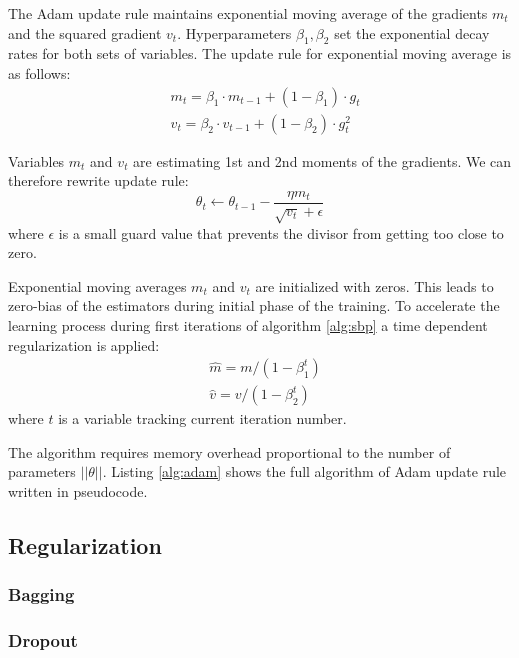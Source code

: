The Adam update rule maintains exponential moving average of the gradients $m_t$ and the squared gradient $v_t$.
Hyperparameters $\beta_1, \beta_2$ set the exponential decay rates for both sets of variables.
The update rule for exponential moving average is as follows:
\begin{equation*}
  \begin{aligned}
    & m_t = \beta_1 \cdot m_{t-1} + (1-\beta_1) \cdot g_t \\
    & v_t = \beta_2 \cdot v_{t-1} + (1-\beta_2) \cdot g_t^2
  \end{aligned}
\end{equation*}

Variables $m_t$ and $v_t$ are estimating 1st and 2nd moments of the gradients.
We can therefore rewrite update rule:
\begin{equation}
  \theta_t \gets \theta_{t-1} - \frac{\eta m_t}{\sqrt{v_t} + \epsilon}
\end{equation}
where $\epsilon$ is a small guard value that prevents the divisor from getting too close to zero.

Exponential moving averages $m_t$ and $v_t$ are initialized with zeros.
This leads to zero-bias of the estimators during initial phase of the training.
To accelerate the learning process during first iterations of algorithm \ref{alg:sbp} a time dependent regularization is applied:
\begin{equation*}
  \begin{aligned}
    & \hat{m} = m / (1-\beta_1^t) \\
    & \hat{v} = v/(1-\beta_2^t)
  \end{aligned}
\end{equation*}
where $t$ is a variable tracking current iteration number.

The algorithm requires memory overhead proportional to the number of parameters $||\theta||$. Listing \ref{alg:adam} shows the full algorithm of Adam update rule written in pseudocode.



\subsection{Regularization}

\subsubsection{Bagging}
\subsubsection{Dropout}

